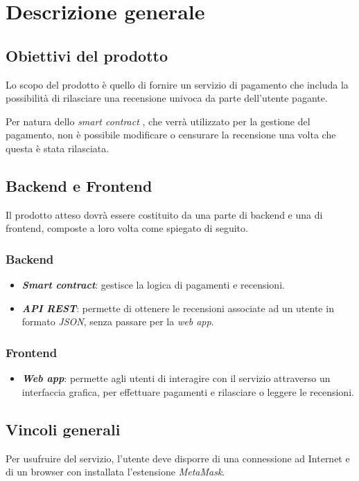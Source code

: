\section{Descrizione generale}

    \subsection{Obiettivi del prodotto}
    Lo scopo del prodotto è quello di fornire un servizio di pagamento che includa la possibilità di rilasciare una recensione univoca da parte dell'utente pagante.

    Per natura dello \textit{smart contract} \glo\:, che verrà utilizzato per la gestione del pagamento, non è possibile modificare o censurare la recensione una volta che questa è stata rilasciata.

    \subsection{Backend e Frontend}
    Il prodotto atteso dovrà essere costituito da una parte di backend e una di frontend, composte a loro volta come spiegato di seguito.

        \subsubsection{Backend}
        \begin{itemize}
            \item \textit{\textbf{Smart contract}}: gestisce la logica di pagamenti e recensioni.
            \item \textit{\textbf{API REST}}\glo: permette di ottenere le recensioni associate ad un utente in formato \textit{JSON}\glo, senza passare per la \textit{web app}.
        \end{itemize}

        \subsubsection{Frontend}
        \begin{itemize}
            \item \textit{\textbf{Web app}}: permette agli utenti di interagire con il servizio attraverso un interfaccia grafica, per effettuare pagamenti e rilasciare o leggere le recensioni.
        \end{itemize}
    \subsection{Vincoli generali}
    Per usufruire del servizio, l'utente deve disporre di una connessione ad Internet e di un browser con installata l'estensione \textit{MetaMask}\glo.